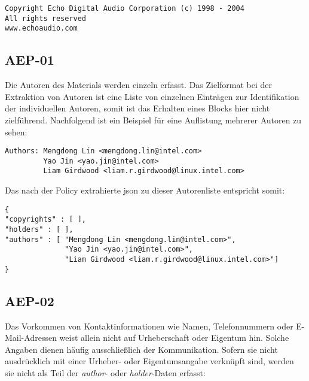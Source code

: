 \begin{lstlisting}[keepspaces=true]
Copyright Echo Digital Audio Corporation (c) 1998 - 2004
All rights reserved
www.echoaudio.com
\end{lstlisting}


\subsection{AEP-01}\label{subsec:aep-01}

Die Autoren des Materials werden einzeln erfasst.
Das Zielformat bei der Extraktion von Autoren ist eine Liste von einzelnen Einträgen zur Identifikation der individuellen Autoren, somit ist das Erhalten eines Blocks hier nicht zielführend.
Nachfolgend ist ein Beispiel für eine Auflistung mehrerer Autoren zu sehen:

\begin{lstlisting}[keepspaces=true]
Authors: Mengdong Lin <mengdong.lin@intel.com>
         Yao Jin <yao.jin@intel.com>
         Liam Girdwood <liam.r.girdwood@linux.intel.com>
\end{lstlisting}

Das nach der Policy extrahierte \gls{json} zu dieser Autorenliste entspricht somit:

\begin{lstlisting}[keepspaces=true]
{
"copyrights" : [ ],
"holders" : [ ],
"authors" : [ "Mengdong Lin <mengdong.lin@intel.com>",
              "Yao Jin <yao.jin@intel.com>",
              "Liam Girdwood <liam.r.girdwood@linux.intel.com>"]
}
\end{lstlisting}


\subsection{AEP-02}\label{subsec:aep-02}

Das Vorkommen von Kontaktinformationen wie Namen, Telefonnummern oder E-Mail-Adressen weist allein nicht auf Urheberschaft oder Eigentum hin.
Solche Angaben dienen häufig ausschließlich der Kommunikation.
Sofern sie nicht ausdrücklich mit einer Urheber- oder Eigentumsangabe verknüpft sind, werden sie nicht als Teil der \textit{author}- oder \textit{holder}-Daten erfasst:

